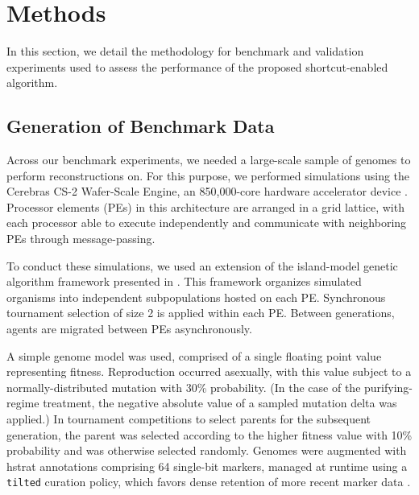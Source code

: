 \section{Methods} \label{sec:methods}

In this section, we detail the methodology for benchmark and validation experiments used to assess the performance of the proposed shortcut-enabled algorithm.

\subsection{Generation of Benchmark Data}

Across our benchmark experiments, we needed a large-scale sample of genomes to perform reconstructions on.
For this purpose, we performed simulations using the Cerebras CS-2
Wafer-Scale Engine, an 850,000-core hardware accelerator device \citep{lie2023cerebras}.
Processor elements (PEs) in this architecture are arranged in a grid lattice, with each processor able to execute independently and communicate with neighboring PEs through message-passing.

To conduct these simulations, we used an extension of the island-model genetic algorithm framework presented in \citep{moreno2024trackable}.
This framework organizes simulated organisms into independent subpopulations hosted on each PE.
Synchronous tournament selection of size 2 is applied within each PE.
Between generations, agents are migrated between PEs asynchronously.


A simple genome model was used, comprised of a single floating point value representing fitness.
Reproduction occurred asexually, with this value subject to a normally-distributed mutation with 30\% probability.
(In the case of the purifying-regime treatment, the negative absolute value of a sampled mutation delta was applied.)
In tournament competitions to select parents for the subsequent generation, the parent was selected according to the higher fitness value with 10\% probability and was otherwise selected randomly.
Genomes were augmented with hstrat annotations comprising 64 single-bit markers, managed at runtime using a \texttt{tilted} curation policy, which favors dense retention of more recent marker data \citep{moreno2024structured}.

